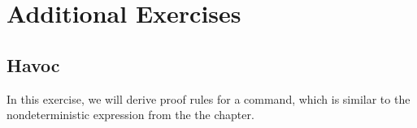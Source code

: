 \documentclass[12pt]{report}
\begin{document}
{{{{{{\section{Additional Exercises}


\begin{coqdoccode}
\coqdocemptyline
\end{coqdoccode}
\subsection{Havoc}



 In this exercise, we will derive proof rules for a 
    command, which is similar to the nondeterministic  expression
    from the the  chapter.


}}}}}}
\end{document}
